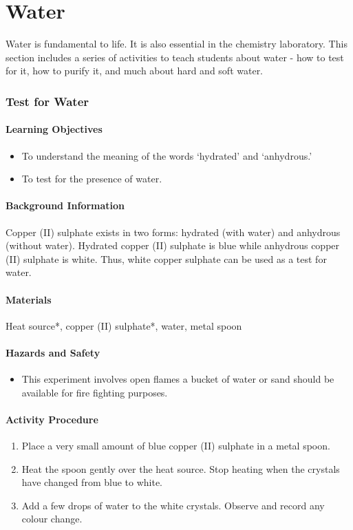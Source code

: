 \chapter{Water}

Water is fundamental to life. It is also essential in the chemistry laboratory. This section includes a series of activities to teach students about water - how to test for it, how to purify it, and much about hard and soft water.

\subsection{Test for Water}

\subsubsection*{Learning Objectives}
\begin{itemize}
\item{To understand the meaning of the words `hydrated' and `anhydrous.'}
\item{To test for the presence of water.}
\end{itemize}

\subsubsection*{Background Information}
Copper (II) sulphate exists in two forms: hydrated (with water) and anhydrous (without water). Hydrated copper (II) sulphate is blue while anhydrous copper (II) sulphate is white. Thus, white copper sulphate can be used as a test for water.

\subsubsection*{Materials}
Heat source*, copper (II) sulphate*, water, metal spoon

\subsubsection*{Hazards and Safety}
\begin{itemize}
\item{This experiment involves open flames a bucket of water or sand should be available for fire fighting purposes.}
\end{itemize}

\subsubsection*{Activity Procedure}
\begin{enumerate}
\item{Place a very small amount of blue copper (II) sulphate in a metal spoon.}
\item{Heat the spoon gently over the heat source. Stop heating when the crystals have changed from blue to white.}
\item{Add a few drops of water to the white crystals. Observe and record any colour change.}
\end{enumerate}

